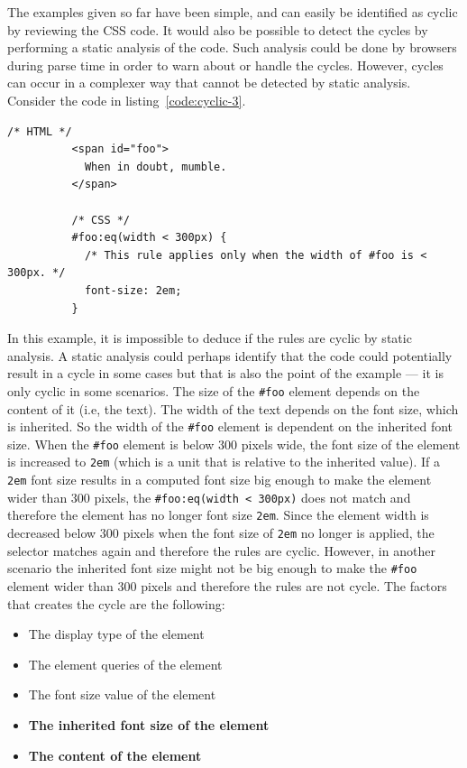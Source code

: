\documentclass[a4paper,11pt]{kth-mag}
\newcommand{\code}[1]{\texttt{#1}}
\begin{document}
        The examples given so far have been simple, and can easily be identified as cyclic by reviewing the \gls{CSS} code.
        It would also be possible to detect the cycles by performing a static analysis of the code.
        Such analysis could be done by \glspl{browser} during parse time in order to warn about or handle the cycles.
        However, cycles can occur in a complexer way that cannot be detected by static analysis.
        Consider the code in listing~\ref{code:cyclic-3}.
        \begin{lstlisting}[gobble=10,caption={Example of cyclic rules that cannot be detected by static analysis.}, captionpos=b, label={code:cyclic-3}]
          /* HTML */
          <span id="foo">
            When in doubt, mumble.
          </span>

          /* CSS */
          #foo:eq(width < 300px) {
            /* This rule applies only when the width of #foo is < 300px. */
            font-size: 2em;
          }
        \end{lstlisting}
        In this example, it is impossible to deduce if the rules are cyclic by static analysis.
        A static analysis could perhaps identify that the code could potentially result in a cycle in some cases but that is also the point of the example --- it is only cyclic in some scenarios.
        The size of the \code{\#foo} element depends on the content of it (i.e, the text).
        The width of the text depends on the font size, which is inherited.
        So the width of the \code{\#foo} \gls{element} is dependent on the inherited font size.
        When the \code{\#foo} \gls{element} is below 300 pixels wide, the font size of the element is increased to \code{2em} (which is a unit that is relative to the inherited value).
        If a \code{2em} font size results in a computed font size big enough to make the \gls{element} wider than 300 pixels, the \code{\#foo:eq(width < 300px)} does not match and therefore the element has no longer font size \code{2em}.
        Since the element width is decreased below 300 pixels when the font size of \code{2em} no longer is applied, the selector matches again and therefore the rules are cyclic.
        However, in another scenario the inherited font size might not be big enough to make the \code{\#foo} element wider than 300 pixels and therefore the rules are not cycle.
        The factors that creates the cycle are the following:
        \begin{itemize}
          \item The display type of the \gls{element}
          \item The \gls{element} queries of the \gls{element}
          \item The font size value of the \gls{element}
          \item \textbf{The inherited font size of the \gls{element}}
          \item \textbf{The content of the \gls{element}}
        \end{itemize}
\end{document}

